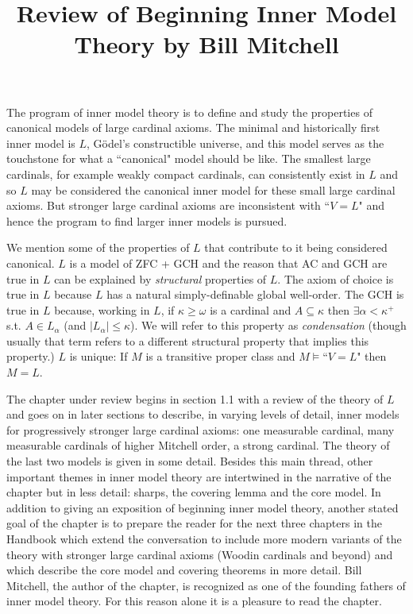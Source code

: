 \documentclass[oneside,12pt]{amsart}
\begin{document}
\title{Review of Beginning Inner Model Theory by Bill Mitchell}

\maketitle

The program of inner model theory is to define and study the properties of
canonical models of large cardinal axioms. The minimal and historically first
inner model is $L$, G\"{o}del's constructible universe, and this model serves
as the touchstone for what a ``canonical" model should be like. The smallest
large cardinals, for example weakly compact cardinals, can consistently exist
in $L$ and so $L$ may be considered the canonical inner model for these small
large cardinal axioms. But stronger large cardinal axioms are inconsistent
with ``$V=L$" and hence the program to find larger inner models is pursued.

We mention some of the properties of $L$ that contribute to it being considered
canonical. $L$ is a model of ZFC + GCH and the reason that AC and GCH are true
in $L$ can be explained by \emph{structural} properties of $L$. The axiom of choice
is true in $L$ because $L$ has a natural simply-definable global well-order.
The GCH is true in $L$ because, working in $L$, if $\kappa\geq\omega$ is a cardinal
and $A\subseteq\kappa$  then $\exists \alpha<\kappa^{+}$ s.t.
$A\in L_{\alpha}$ (and $|L_{\alpha}| \leq \kappa$).
We will refer to this property as \emph{condensation} (though usually that term refers
to a different structural property that implies this property.)
$L$ is unique: If $M$ is a transitive proper class and $M\models$``$V=L$" then $M=L$.

The chapter under review begins in section 1.1 with a review of the theory of $L$
and goes on in later sections to describe, in varying levels of detail, inner
models for progressively stronger large cardinal axioms: one measurable cardinal,
many measurable cardinals of higher Mitchell order, a strong cardinal. The theory
of the last two models is given in some detail. Besides this main thread,
other important themes in inner model theory are intertwined in the narrative
of the chapter but in less detail: sharps, the covering lemma and the core model.
In addition to giving an exposition of beginning inner model theory,
another stated goal of the chapter
is to prepare the reader for the next three chapters
in the Handbook which extend the conversation to include more
modern variants of the theory with stronger large cardinal axioms (Woodin cardinals
and beyond) \cite{Outline} and which describe the core model \cite{CoreModelToolbox}
and covering theorems \cite{CoveringLemmaInHandbook} in more detail.
Bill Mitchell, the author of the chapter, is recognized as one of the founding
fathers of inner model theory. For this reason alone it is a pleasure to read
the chapter.
\end{document}
